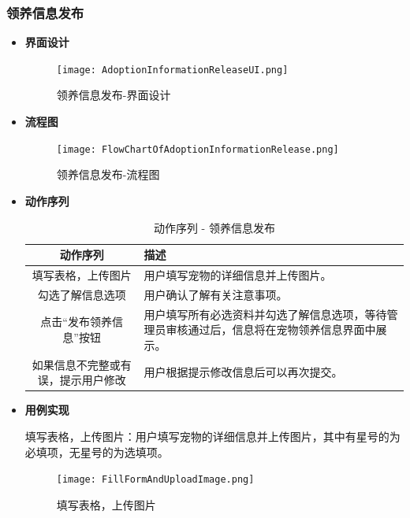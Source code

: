 \subsubsection{领养信息发布}

\begin{itemize}
	\item[] \textbf{界面设计}
	
	\begin{figure}[H]
		\centering
		\texttt{[image: AdoptionInformationReleaseUI.png]} 
		\caption{领养信息发布-界面设计}
		\label{fig:Adoption information release UI}
	\end{figure}
	
	\item[] \textbf{流程图}
	\begin{figure}[H]
		\centering
		\texttt{[image: FlowChartOfAdoptionInformationRelease.png]} 
		\caption{领养信息发布-流程图}
		\label{fig:Flow chart of adoption information release}
	\end{figure}
	
	\item[] \textbf{动作序列}
	
	\begin{table}[H]
		\centering
		\caption{动作序列 - 领养信息发布}
		\renewcommand\arraystretch{1.5}
		\begin{tabular}{|c|>{\raggedright\arraybackslash}p{7cm}|}
			\hline
			\textbf{动作序列} & \textbf{描述} \\ \hline
			填写表格，上传图片 & 用户填写宠物的详细信息并上传图片。 \\ \hline
			勾选了解信息选项 & 用户确认了解有关注意事项。 \\ \hline
			点击“发布领养信息”按钮 & 用户填写所有必选资料并勾选了解信息选项，等待管理员审核通过后，信息将在宠物领养信息界面中展示。 \\ \hline
			如果信息不完整或有误，提示用户修改 & 用户根据提示修改信息后可以再次提交。 \\ \hline
		\end{tabular}
		\label{table:adoption-post-sequence}
	\end{table}
	
	\item[] \textbf{用例实现}
	
	填写表格，上传图片：用户填写宠物的详细信息并上传图片，其中有星号的为必填项，无星号的为选填项。
	
	\begin{figure}[H]
		\centering
		\texttt{[image: FillFormAndUploadImage.png]} 
		\caption{填写表格，上传图片}
		\label{fig:Fill form and upload image}
	\end{figure}
	

\end{itemize}
